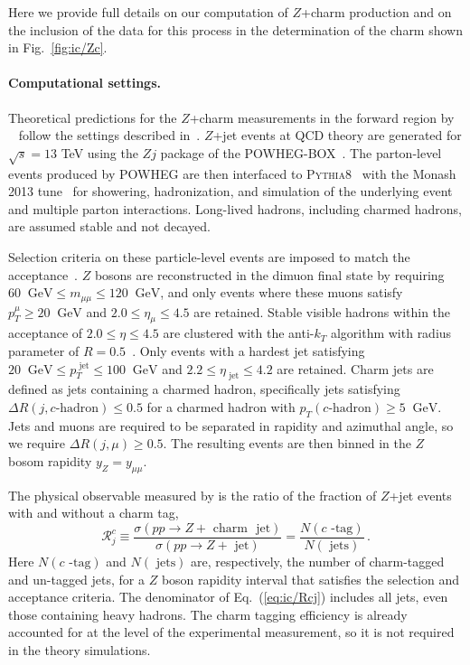 
Here we provide full details on our computation of  $Z$+charm
production and on the inclusion of the \lhcb data for this
process in the determination of the charm \pdf shown in
Fig.~\ref{fig:ic/Zc}. 

\paragraph{Computational settings.}
%
Theoretical predictions for
the $Z$+charm measurements in the forward region 
by \lhcb~\cite{LHCb:2021stx} follow the 
 settings described in~\cite{Boettcher:2015sqn}.
%
$Z$+jet events at \nlo QCD theory are generated for $\sqrt{s}= 13$ TeV  using the $Zj$ package of the
\textsc{\small POWHEG-BOX}~\cite{Alioli:2010xd}.
%
The parton-level events produced by \textsc{\small POWHEG}
are then interfaced to \textsc{\small Pythia8}~\cite{Sjostrand:2007gs}
with the Monash 2013 tune~\cite{Skands:2014pea} for showering,
hadronization, and simulation of the underlying event and multiple
parton interactions.
%
Long-lived hadrons, including charmed hadrons,
are assumed stable and not decayed.

Selection criteria on these particle-level events are imposed
to match the \lhcb acceptance~\cite{LHCb:2021stx}.
%
$Z$ bosons are reconstructed in the dimuon final state by
requiring $60~\textrm{ GeV}\le m_{\mu\mu} \le 120~\textrm{ GeV}$,
and
only events where these muons satisfy
    $p_T^\mu \ge 20~\textrm{ GeV}$ and $2.0 \le \eta_{\mu}\le 4.5$
    are retained.
%
Stable visible hadrons within the \lhcb acceptance of
$2.0 \le \eta \le 4.5$ are clustered with
the anti-$k_T$ algorithm with radius parameter
of $R=0.5$~\cite{Cacciari:2008gp}.
%
Only events with a hardest jet satisfying
  $ 20~\textrm{ GeV} \le p_T^\textrm{ jet} \le 100~\textrm{ GeV}$
and $2.2 \le \eta_\textrm{ jet}\le 4.2$ are retained.
%
Charm jets are defined as jets containing
a charmed hadron, specifically  jets satisfying
$\Delta R(j, c\textrm{-hadron})\le 0.5$ for a charmed
hadron with $p_T(c\textrm{-hadron})\ge 5~\textrm{ GeV}$.
%
Jets and muons are required to be separated
in rapidity and azimuthal angle, so
we require $\Delta R(j, \mu)\ge 0.5$.
%
The resulting events
are then binned in the $Z$ bosom rapidity $y_Z = y_{\mu \mu}$.

The physical observable measured by \lhcb is the ratio of the fraction of $Z$+jet
    events with and without a charm tag,
    \begin{equation}
    \label{eq:ic/Rcj}
        \mathcal{R}_j^c \equiv \frac{\sigma(pp\to Z+\textrm{ charm~ jet})}{\sigma(pp \to Z+\textrm{ jet})}=
         \frac{N(c\textrm{ -tag})}{ 
        N(\textrm{ jets})} \, .
    \end{equation}
 Here  $N(c\textrm{ -tag})$ and $N(\textrm{ jets})$ are, respectively, the number
    of charm-tagged and un-tagged jets, for a  $Z$ boson rapidity interval
    that satisfies the selection and acceptance criteria.
    The denominator of Eq.~(\ref{eq:ic/Rcj}) includes all jets, even those
    containing heavy hadrons.
The charm tagging efficiency is already accounted for at the level
of the experimental measurement, so it is not required in the theory
simulations.


